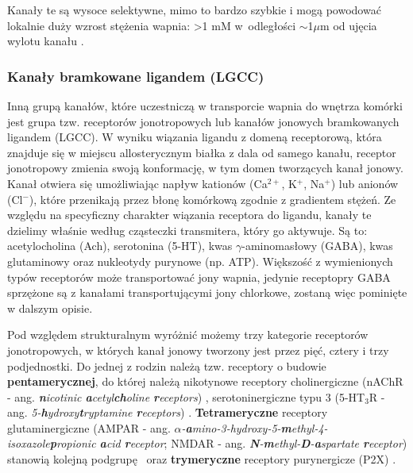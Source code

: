 Kanały te są wysoce selektywne, mimo to bardzo szybkie i mogą powodować lokalnie duży wzrost stężenia wapnia: >1 mM w~odległości $\sim$1$\mu$m od ujęcia wylotu kanału \cite{Piedras-Rentera2012}.

\subsubsection{Kanały bramkowane ligandem (LGCC)}\label{ss:lgcc}

Inną grupą kanałów, które uczestniczą w transporcie wapnia do wnętrza komórki jest grupa tzw. receptorów jonotropowych lub kanałów jonowych bramkowanych ligandem (LGCC). W wyniku wiązania ligandu z domeną receptorową, która znajduje się w miejscu allosterycznym białka z dala od samego kanału, receptor jonotropowy zmienia swoją konformację, w tym domen tworzących kanał jonowy. Kanał otwiera się umożliwiając napływ kationów (Ca$^{2+}$, K$^+$, Na$^+$) lub anionów (Cl$^-$), które przenikają przez błonę komórkową zgodnie z gradientem stężeń. Ze względu na specyficzny charakter wiązania receptora do ligandu, kanały te dzielimy właśnie według cząsteczki transmitera, który go aktywuje. Są to: acetylocholina (Ach), serotonina (5-HT), kwas $\gamma$-aminomasłowy (GABA), kwas glutaminowy oraz nukleotydy purynowe (np. ATP). Większość z wymienionych typów receptorów może transportować jony wapnia, jedynie receptopry GABA sprzężone są z kanałami transportującymi jony chlorkowe, zostaną więc pominięte w dalszym opisie.

Pod względem strukturalnym wyróżnić możemy trzy kategorie receptorów jonotropowych, w których kanał jonowy tworzony jest przez pięć, cztery i trzy podjednostki. Do jednej z rodzin należą tzw. receptory o budowie \textbf{pentamerycznej}, do której należą nikotynowe receptory cholinergiczne (nAChR - ang. \textit{\textbf{n}icotinic \textbf{a}cetyl\textbf{ch}oline \textbf{r}eceptors}) \cite{Beker2003,Weber2005}, serotoninergiczne typu 3 (5-HT$_3$R - ang. \textit{5-\textbf{h}ydroxy\textbf{t}ryptamine \textbf{r}eceptors}) \cite{Perez2005}. \textbf{Tetrameryczne} receptory glutaminergiczne (AMPAR - ang. \textit{$\alpha$-\textbf{a}mino-3-hydroxy-5-\textbf{m}ethyl-4-isoxazole\textbf{p}ropionic \textbf{a}cid \textbf{r}eceptor}; NMDAR - ang. \textit{\textbf{N}-\textbf{m}ethyl-\textbf{D}-\textbf{a}spartate \textbf{r}eceptor}) stanowią kolejną podgrupę~\cite{MacDermott1986} oraz \textbf{trymeryczne} receptory purynergicze (P2X) \cite{Egan2004,Jarvis2009,North2002}.

